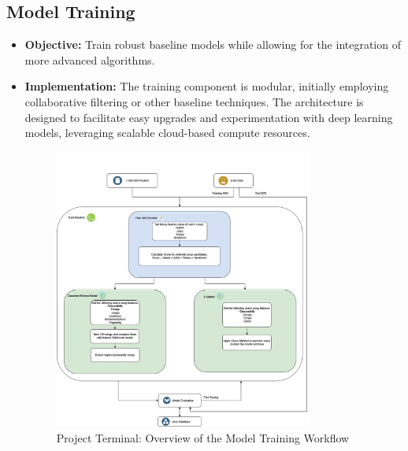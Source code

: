 \documentclass{article}
\begin{document}
\subsection{Model Training}
\begin{itemize}
    \item \textbf{Objective:} Train robust baseline models while allowing for the integration of more advanced algorithms.
    \item \textbf{Implementation:} The training component is modular, initially employing collaborative filtering or other baseline techniques. The architecture is designed to facilitate easy upgrades and experimentation with deep learning models, leveraging scalable cloud-based compute resources.
    \begin{figure}[H]
      \centering
      \includegraphics[width=0.8\textwidth]{Proyecto_Terminal.png}
      \caption{Project Terminal: Overview of the Model Training Workflow}
      \label{fig:project_terminal}
  \end{figure}
\end{itemize}
\end{document}
